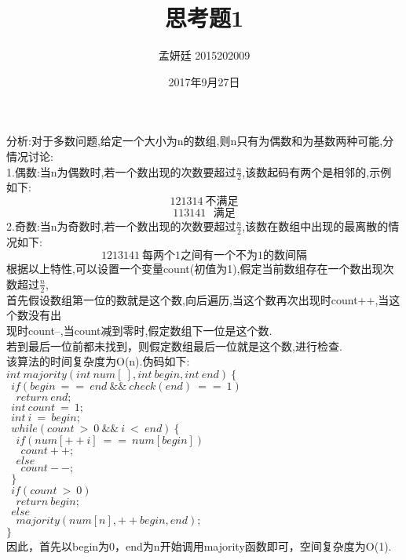 \documentclass[19pt,a4paper]{article}
\title{思考题1}
\author{孟妍廷 2015202009}
\date{2017年9月27日}
\begin{document}
\maketitle
\indent 分析:对于多数问题,给定一个大小为n的数组,则n只有为偶数和为基数两种可能,分情况讨论:\\
\indent 1.偶数:当n为偶数时,若一个数出现的次数要超过$\frac{n}{2}$,该数起码有两个是相邻的,示例如下:\\
$$121314\ 不满足$$
$$113141\ \ \ 满足$$
\indent 2.奇数:当n为奇数时,若一个数出现的次数要超过$\frac{n}{2}$,该数在数组中出现的最离散的情况如下:\\
$$1213141\ 每两个1之间有一个不为1的数间隔$$
\indent 根据以上特性,可以设置一个变量count(初值为1),假定当前数组存在一个数出现次数超过$\frac{n}{2}$,\\
\indent 首先假设数组第一位的数就是这个数,向后遍历,当这个数再次出现时count++,当这个数没有出\\
\indent 现时count--,当count减到零时,假定数组下一位是这个数.\\
\indent 若到最后一位前都未找到，则假定数组最后一位就是这个数,进行检查.\\
\indent 该算法的时间复杂度为O(n).伪码如下:\\
\indent $int\ majority(int\ num[\ ],int\ begin,int\ end) \ \{ $\\
\indent $\ \ if(begin\ ==\ end\ \&\&\ check(end)\ ==\ 1)$\\
\indent $\ \ \ \ return\ end;$\\
\indent $ \ \ int\ count\ =\ 1; $\\
\indent $ \ \ int\ i \ =\ begin; $\\
\indent $ \ \ while(count\ >\ 0\ \&\&\ i\ <\ end)\ \{$\\
\indent $ \ \ \ \ if(num[++i]\ ==\ num[begin])$\\
\indent $ \ \ \ \ \ \ count++;$\\
\indent $ \ \ \ \ else$\\
\indent $ \ \ \ \ \ \ count--;$\\
\indent $\ \ \}$\\
\indent $\ \ if(count\ >\ 0)$\\
\indent $\ \ \ \ return\ begin;$\\
\indent $\ \ else\ $\\
\indent $\ \ \ \ majority(num[n],++begin,end);$\\
\indent $\}$\\
\indent 因此，首先以begin为0，end为n开始调用majority函数即可，空间复杂度为O(1).
\end{document}
